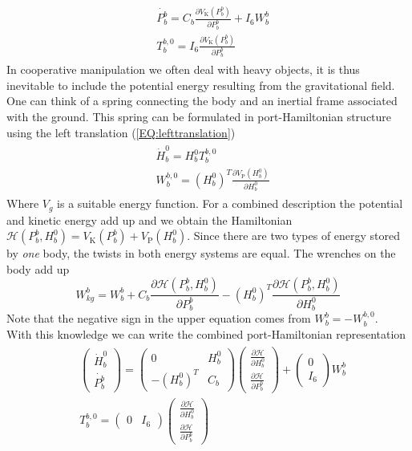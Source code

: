 \documentclass[a4paper,twoside, openright,12pt]{report}
\newcommand{\g}[1]{\text{#1}}
\begin{document}
\begin{eqnarray}\label{EQ:PHSsimpleinertia}
\begin{aligned}
	&\dot{P_b^b} = C_b \frac{\partial V_\g{K}(P_b^b)}{\partial P_b^b} + I_6 W_{b}^b \\
	&T_b^{b,0} = I_6 \frac{\partial V_\g{K}(P_b^b)}{\partial P_b^b}
\end{aligned}
\end{eqnarray}
In cooperative manipulation we often deal with heavy objects, it is thus inevitable to include the potential energy resulting from the gravitational field. One can think of a spring connecting the body and an inertial frame associated with the ground. This spring can be formulated in port-Hamiltonian structure using the left translation (\ref{EQ:lefttranslation})
\begin{eqnarray}\label{EQ:gravityspring}
\begin{aligned}
	&\dot{H}_b^0 = H_b^0 T_b^{b,0}\\
	&W_b^{b,0} = (H_b^0)^T\frac{\partial V_\g{P}(H_b^0)}{\partial H_b^0}
\end{aligned}
\end{eqnarray}
Where $V_g$ is a suitable energy function. For a combined description the potential and kinetic energy add up and we obtain the Hamiltonian $\mathcal{H}(P_b^b,H_b^0) = V_\g{K}(P_b^b) + V_\g{P}(H_b^0)$. Since there are two types of energy stored by \emph{one} body, the twists in both energy systems are equal. The wrenches on the body add up   
\[W_{kg}^b = W_{b}^b + C_b \frac{\partial \mathcal{H}(P_b^b,H_b^0)}{\partial P_b^b} - (H_b^0)^T \frac{\partial \mathcal{H}(P_b^b,H_b^0)}{\partial H_b^0} \]
Note that the negative sign in the upper equation comes from $W_b^b = - W_b^{b,0} $.\\
With this knowledge we can write the combined port-Hamiltonian representation
\begin{eqnarray} \label{EQ:PHSinertia}
\begin{aligned}
&\begin{pmatrix}\dot{H}_b^0 \\ \dot{P_b^b}\end{pmatrix} =
\begin{pmatrix} 0 & H_b^0  \\
- (H_b^0)^T & C_b\end{pmatrix}
\begin{pmatrix}\frac{\partial \mathcal{H}}{\partial H_b^0} \\ \frac{\partial \mathcal{H}}{\partial P_b^b}\end{pmatrix}+
\begin{pmatrix}0 \\ I_6\end{pmatrix} W_{b}^b \\
&T_b^{b,0} = \begin{pmatrix}0 & I_6\end{pmatrix}
\begin{pmatrix}\frac{\partial \mathcal{H}}{\partial H_b^0} \\ \frac{\partial \mathcal{H}}{\partial P_b^b}\end{pmatrix}
\end{aligned}
\end{eqnarray}
\end{document}
